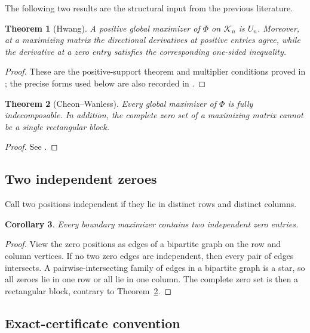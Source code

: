 \documentclass[11pt]{amsart}
\newtheorem{theorem}{Theorem}[section]
\newtheorem{corollary}[theorem]{Corollary}
\theoremstyle{definition}
\theoremstyle{remark}
\begin{document}
The following two results are the structural input from the previous
literature.

\begin{theorem}[Hwang]\label{thm:hwang-positive}
A positive global maximizer of \(\Phi\) on \(\mathcal K_n\) is \(U_n\).
Moreover, at a maximizing matrix the directional derivatives at positive
entries agree, while the derivative at a zero entry satisfies the
corresponding one-sided inequality.
\end{theorem}

\begin{proof}
These are the positive-support theorem and multiplier conditions proved in
\cite{HwangDittert,Hwang87}; the precise forms used below are also recorded
in \cite[Lemmas~3.5--3.6]{CW}.
\end{proof}

\begin{theorem}[Cheon--Wanless]\label{thm:cw-boundary}
Every global maximizer of \(\Phi\) is fully indecomposable.  In addition,
the complete zero set of a maximizing matrix cannot be a single
rectangular block.
\end{theorem}

\begin{proof}
See \cite[Theorems~3.2 and~3.7]{CW}.
\end{proof}

\subsection{Two independent zeroes}

Call two positions independent if they lie in distinct rows and distinct
columns.

\begin{corollary}\label{cor:two-independent-zeroes}
Every boundary maximizer contains two independent zero entries.
\end{corollary}

\begin{proof}
View the zero positions as edges of a bipartite graph on the row and column
vertices.  If no two zero edges are independent, then every pair of edges
intersects.  A pairwise-intersecting family of edges in a bipartite graph
is a star, so all zeroes lie in one row or all lie in one column.  The
complete zero set is then a rectangular block, contrary to
Theorem~\ref{thm:cw-boundary}.
\end{proof}

\subsection{Exact-certificate convention}
\end{document}

